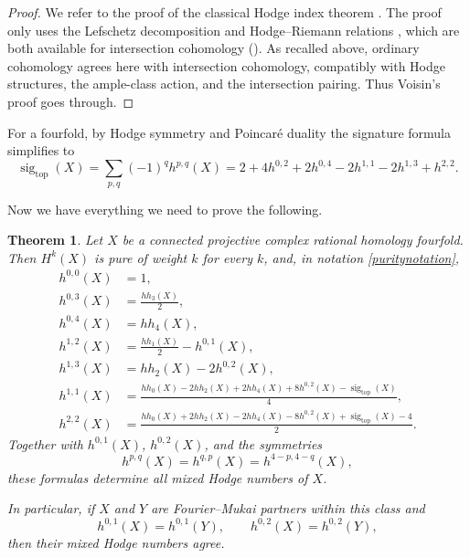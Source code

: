 \documentclass{amsart}
\theoremstyle{plain}
\newtheorem{theorem}[prop]{Theorem}
\theoremstyle{definition}
\DeclareMathOperator{\sig}{sig}
\begin{document}
\begin{proof}
We refer to the proof of the classical Hodge index theorem \cite[Theorem~6.33]{Voi02}. The proof only uses the Lefschetz decomposition and Hodge--Riemann relations \cite[Theorem~6.32]{Voi02}, which are both available for intersection cohomology (\cite[Theorem~2.2.3(c)--(d)]{dCM05}).
As recalled above, ordinary cohomology agrees here with intersection cohomology, compatibly with Hodge structures, the ample-class action, and the intersection pairing. Thus Voisin's proof goes through.
\end{proof}
For a fourfold, by Hodge symmetry and Poincar\'e duality the signature formula simplifies to
\begin{equation}\label{eqfourfoldsignature}
\sig_{\mathrm{top}}(X)=\sum_{p,q}(-1)^q h^{p,q}(X)=2+4h^{0,2}+2h^{0,4}-2h^{1,1}-2h^{1,3}+h^{2,2}.
\end{equation}

Now we have everything we need to prove the following.

\begin{theorem}\label{thmfourfoldreconstruction}
Let $X$ be a connected projective complex rational homology fourfold. Then $H^k(X)$ is pure of weight $k$ for every $k$, and, in notation \eqref{puritynotation},
\begin{equation}\label{eqfourfoldinversion}
\begin{aligned}
h^{0,0}(X)&=1,\\
h^{0,3}(X)&=\frac{hh_3(X)}{2},\\
h^{0,4}(X)&=hh_4(X),\\
h^{1,2}(X)&=\frac{hh_1(X)}{2}-h^{0,1}(X),\\
h^{1,3}(X)&=hh_2(X)-2h^{0,2}(X),\\
h^{1,1}(X)
&=\frac{
hh_0(X)-2hh_2(X)+2hh_4(X)
+8h^{0,2}(X)-\sig_{\mathrm{top}}(X)
}{4},\\
h^{2,2}(X)
&=\frac{
hh_0(X)+2hh_2(X)-2hh_4(X)
-8h^{0,2}(X)+\sig_{\mathrm{top}}(X)-4
}{2}.
\end{aligned}
\end{equation}
Together with $h^{0,1}(X)$, $h^{0,2}(X)$, and the symmetries
\[
h^{p,q}(X)=h^{q,p}(X)=h^{4-p,4-q}(X),
\]
these formulas determine all mixed Hodge numbers of $X$.

In particular, if $X$ and $Y$ are Fourier--Mukai partners within this class and
\[
h^{0,1}(X)=h^{0,1}(Y),
\qquad
h^{0,2}(X)=h^{0,2}(Y),
\]
then their mixed Hodge numbers agree.
\end{theorem}
\end{document}
